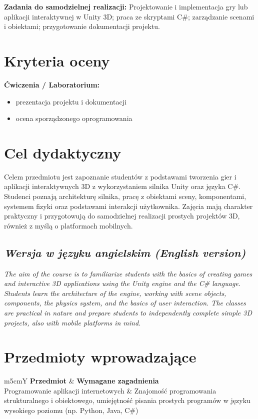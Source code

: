 \documentclass[12pt, a4paper]{article}
\newcommand{\thdrule}{\noalign{\global\setlength{\extrarowheight}{0pt}}}
\newcommand{\thdend}{\noalign{\global\setlength{\extrarowheight}{3pt}}}
\begin{document}
\vspace{4pt}
\noindent\textbf{Zadania do samodzielnej realizacji:} Projektowanie i implementacja gry lub aplikacji interaktywnej w Unity 3D; praca ze skryptami C\#; zarządzanie scenami i obiektami; przygotowanie dokumentacji projektu.

\section{Kryteria oceny}

\textbf{Ćwiczenia / Laboratorium:}
\begin{itemize}
  \item prezentacja projektu i dokumentacji
  \item ocena sporządzonego oprogramowania
\end{itemize}


\section{Cel dydaktyczny}

Celem przedmiotu jest zapoznanie studentów z podstawami tworzenia gier i aplikacji interaktywnych 3D z wykorzystaniem silnika Unity oraz języka C\#. Studenci poznają architekturę silnika, pracę z obiektami sceny, komponentami, systemem fizyki oraz podstawami interakcji użytkownika. Zajęcia mają charakter praktyczny i przygotowują do samodzielnej realizacji prostych projektów 3D, również z myślą o platformach mobilnych.

\subsection*{\textit{Wersja w języku angielskim (English version)}}

\textit{The aim of the course is to familiarize students with the basics of creating games and interactive 3D applications using the Unity engine and the C\# language. Students learn the architecture of the engine, working with scene objects, components, the physics system, and the basics of user interaction. The classes are practical in nature and prepare students to independently complete simple 3D projects, also with mobile platforms in mind.}


\section{Przedmioty wprowadzające}

{\scriptsize
\begin{tabularx}{\textwidth}{m{5cm}Y}
\thdrule\toprule
{} {\color{white}\textbf{Przedmiot}} & {\color{white}\textbf{Wymagane zagadnienia}} \\
\midrule\thdend
   Programowanie aplikacji internetowych & Znajomość programowania strukturalnego i obiektowego, umiejętność pisania prostych programów w języku wysokiego poziomu (np. Python, Java, C\#) \\
\bottomrule
\end{tabularx}}
\end{document}
